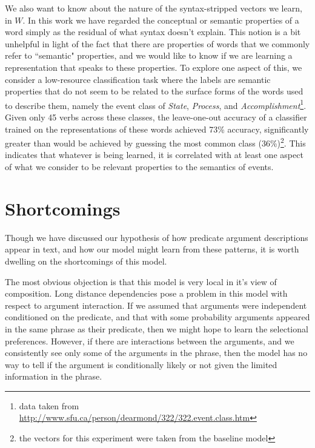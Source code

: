 \documentclass[11pt,letterpaper]{article}
\begin{document}
%
%

We also want to know about the nature of the syntax-stripped vectors we learn, in $W$.
In this work we have regarded the conceptual or semantic properties of a word simply as
the residual of what syntax doesn't explain. This notion is a bit unhelpful in light
of the fact that there are properties of words that we commonly refer to ``semantic" properties,
and we would like to know if we are learning a representation that speaks to these properties.
To explore one aspect of this, we consider a low-resource classification task where
the labels are semantic properties that do not seem to be related to the surface forms
of the words used to describe them, namely the event class of {\em State}, {\em Process},
and {\em Accomplishment}\footnote{data taken from \url{http://www.sfu.ca/person/dearmond/322/322.event.class.htm}}.
Given only 45 verbs across these classes, the leave-one-out accuracy of a classifier trained
on the representations of these words achieved 73\% accuracy, significantly greater than would
be achieved by guessing the most common class (36\%)\footnote{the vectors for this experiment
were taken from the baseline model}.
This indicates that whatever is being learned, it is correlated with at least one aspect of
what we consider to be relevant properties to the semantics of events.





\section{Shortcomings} %
\label{section:unlearnability}
Though we have discussed our hypothesis of how predicate argument descriptions
appear in text, and how our model might learn from these patterns, it is worth
dwelling on the shortcomings of this model.

The most obvious objection is that this model is very local in it's view of composition.
Long distance dependencies pose a problem in this model with respect to argument
interaction. If we assumed that arguments were independent conditioned on the predicate,
and that with some probability arguments appeared in the same phrase as their predicate,
then we might hope to learn the selectional preferences. However, if there are interactions
between the arguments, and we consistently see only some of the arguments in the phrase,
then the model has no way to tell if the argument is conditionally likely or not given
the limited information in the phrase.
\end{document}
